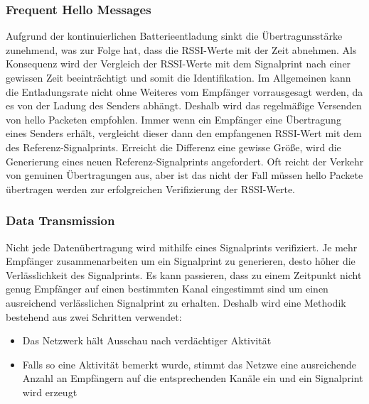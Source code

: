 \documentclass[12pt,a4paper]{article}
\begin{document}
\subsubsection*{Frequent Hello Messages}
Aufgrund der kontinuierlichen Batterieentladung sinkt 
die Übertragunsstärke zunehmend, was zur Folge hat, 
dass die RSSI-Werte mit der Zeit abnehmen. 
Als Konsequenz wird der Vergleich der RSSI-Werte mit 
dem Signalprint nach einer gewissen Zeit beeinträchtigt 
und somit die Identifikation.
Im Allgemeinen kann die Entladungsrate nicht ohne Weiteres 
vom Empfänger vorrausgesagt werden, da es von der Ladung 
des Senders abhängt. Deshalb wird das regelmäßige Versenden 
von  \glqq hello\grqq \hspace{0.5mm} Packeten empfohlen.
Immer wenn ein Empfänger eine Übertragung eines Senders erhält, 
vergleicht dieser dann den empfangenen RSSI-Wert mit dem des 
Referenz-Signalprints. Erreicht die Differenz eine gewisse 
Größe, wird die Generierung eines neuen Referenz-Signalprints 
angefordert. Oft reicht der Verkehr von genuinen Übertragungen 
aus, aber ist das nicht der Fall müssen \glqq hello\grqq
\hspace{0.5mm}Packete übertragen werden zur erfolgreichen 
Verifizierung der RSSI-Werte.


\subsubsection*{Data Transmission}
Nicht jede Datenübertragung wird mithilfe eines Signalprints 
verifiziert. Je mehr Empfänger zusammenarbeiten um ein 
Signalprint zu generieren, desto höher die Verlässlichkeit 
des Signalprints. Es kann passieren, dass zu einem Zeitpunkt 
nicht genug Empfänger auf einen bestimmten Kanal eingestimmt 
sind um einen ausreichend verlässlichen Signalprint zu erhalten. 
Deshalb wird eine Methodik bestehend aus zwei Schritten verwendet:
\begin{itemize}
	\item Das Netzwerk hält Ausschau nach verdächtiger Aktivität
	\item Falls so eine Aktivität bemerkt wurde, stimmt das Netzwe 
	eine ausreichende Anzahl an Empfängern auf die entsprechenden 
	Kanäle ein und ein Signalprint wird erzeugt
\end{itemize}

\end{document}
